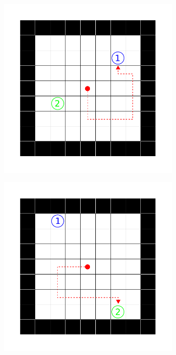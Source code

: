 \iffalse
\begin{figure}[ht!]
  \begin{subfigure}[c]{0.5\textwidth}
    \includegraphics[keepaspectratio,width=\textwidth]{abbildungen/sample_not_seen.pdf}
    \subcaption{}
    \label{sample_visited}
  \end{subfigure}
  \begin{subfigure}[c]{0.5\textwidth}
    \includegraphics[keepaspectratio,width=\textwidth]{abbildungen/sample_visited.pdf}

\end{subfigure}
\end{figure}
